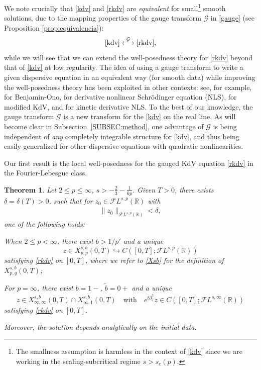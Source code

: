 \documentclass[%
11pt,  reqno]{amsart}
\newcommand{\5}{\textup{V}}
\newcommand{\noi}{\noindent}
\newcommand{\FL}{\mathcal{F} L}
\newcommand{\dl}{\delta}
\newcommand{\jp}{\color{orange}}
\newtheorem{theorem}{Theorem} [section]
\theoremstyle{remark}
\newcommand{\R}{\mathbb{R}}
\newcommand{\Gc}{\mathcal{G}}
\numberwithin{equation}{section}
\numberwithin{theorem}{section}
\begin{document}
\medskip 
    
    We note crucially that \eqref{kdv} and \eqref{rkdv} are \textit{equivalent} for small\footnote{The smallness assumption is harmless in the context of \eqref{kdv} since we are working in the scaling-subcritical regime $s>s_c(p)$.} smooth solutions, due to the mapping properties of the gauge transform $\Gc$ in \eqref{gauge} (see Proposition \ref{prop:equivalencia}):
    $$
\eqref{kdv} \overset{\Gc}{\longleftrightarrow} \eqref{rkdv}, 
    $$
while we will see that we can extend the well-posedness theory for \eqref{rkdv} beyond that of \eqref{kdv} at low regularity. 
%
%
The idea of using a gauge transform to write a given dispersive equation in an equivalent way (for smooth data) while improving the well-posedness theory has been exploited in other contexts: see, for example,   \cite{IfrimTataru, MolinetPilod_bo, tao_bo} for Benjamin-Ono, \cite{CKSTT_dnls, Herr_dnls, takaoka_dnls} for derivative nonlinear Schr\"odinger equation (NLS), \cite{Chapouto_FL_mkdv} for modified KdV, and \cite{KishimotoTsutsumi_kdnls} for kinetic derivative NLS.
To {\jp the best of} our knowledge, the gauge transform $\Gc$ is a new transform for the \eqref{kdv} on the real line. As will become clear in Subsection~\ref{SUBSEC:method}, one advantage of $\Gc$ is being independent of \emph{any} completely integrable structure for \eqref{kdv}, and thus being easily generalized for other dispersive equations with quadratic nonlinearities. 

\medskip

\medskip

 Our first result is the local well-posedness for the gauged KdV equation \eqref{rkdv} in the Fourier-Lebesgue class.
    
	\begin{theorem}\label{thm:lwp_rkdv}
Let $2 \le p \le \infty$, $s> - \frac23 - \frac{1}{6p}$. Given $T>0$, there exists $\dl = \dl(T)>0$, such that for $z_0 \in \FL^{s, p}(\R)$ with
\begin{align}
    \|z_0\|_{\FL^{s,p}(\R)} < \dl, 
\end{align}
one of the following holds:

\vspace{1mm}

\noi{\rm(i)}
When $ 2 \le p <\infty$, 
there exist $b>1/p'$ and  a unique
	$$z\in X^{s,b}_{p, p}(0,T)\hookrightarrow C([0,T]; \mathcal{F}L^{s,p}(\R))$$ satisfying \eqref{rkdv} on $[0,T]$, where we refer to \eqref{Xsb} for the definition of $X^{s,b}_{p,q}(0,T)$;

\vspace{1mm}

\smallskip
\noi{\rm(ii)}
For $p=\infty$, there exist $b=1-$, $\tilde{b}=0+$ and a unique 
	$$z\in X^{s,b}_{\infty,\infty}(0,T)\cap X^{s,\tilde{b}}_{\infty,1}(0,T)
    \quad 
    \text{with}
    \quad 
    e^{t\partial_x^3}z \in C([0,T]; \mathcal{F}L^{s,\infty}(\R))
    $$ 
    satisfying \eqref{rkdv} on $[0,T]$.

\smallskip 
\noi
    Moreover, the solution depends analytically on the initial data.
\end{theorem}
\end{document}
